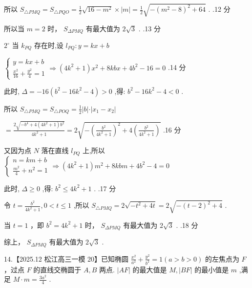 \documentclass[10pt]{article}
\begin{document}
所以 \({S}_{\bigtriangleup {PMQ}} = {S}_{\bigtriangleup {PQO}} = \frac{1}{2}\sqrt{{16} - {m}^{2}} \times  \left| m\right|  = \frac{1}{2}\sqrt{-{\left( {m}^{2} - 8\right) }^{2} + {64}}\) . .12 分

所以当 \(m = 2\) 时， \({S}_{\Delta PMQ}\) 有最大值为 \(2\sqrt{3}\) . .13 分

\({2}^{ \circ  }\) 当 \({k}_{PQ}\) 存在时,设 \({l}_{PQ} : y = {kx} + b\)

\(\left\{  {\begin{matrix} y = {kx} + b \\  \frac{{x}^{2}}{16} + \frac{{y}^{2}}{4} = 1 \end{matrix} \Rightarrow  \left( {4{k}^{2} + 1}\right) {x}^{2} + {8kbx} + 4{b}^{2} - {16} = 0}\right.\) .14 分

此时, \(\Delta  =  - {16}\left( {{b}^{2} - {16}{k}^{2} - 4}\right)  > 0\) ,得: \({b}^{2} - {16}{k}^{2} - 4 < 0\) .

所以 \({S}_{\bigtriangleup {PMQ}} = {S}_{\bigtriangleup {POQ}} = \frac{1}{2}\left| {b\left| \cdot \right| {x}_{1} - {x}_{2}}\right|\)

\(= \frac{2\sqrt{-{b}^{4} + 4\left( {4{k}^{2} + 1}\right) {b}^{2}}}{4{k}^{2} + 1} = 2\sqrt{-{\left( \frac{{b}^{2}}{4{k}^{2} + 1}\right) }^{2} + 4\left( \frac{{b}^{2}}{4{k}^{2} + 1}\right) }\) .16 分

又因为点 \(N\) 落在直线 \({l}_{PQ}\) 上,所以 \(\left\{  {\begin{array}{l} n = {km} + b \\  \frac{{m}^{2}}{4} + {n}^{2} = 1 \end{array} \Rightarrow  \left( {4{k}^{2} + 1}\right) {m}^{2} + {8kbm} + 4{b}^{2} - 4 = 0}\right.\)

此时, \(\Delta  \geq  0\) ,得: \({b}^{2} \leq  4{k}^{2} + 1\) . .17 分

令 \(t = \frac{{b}^{2}}{4{k}^{2} + 1},0 < t \leq  1\) ,所以 \({S}_{\bigtriangleup {PMQ}} = 2\sqrt{-{t}^{2} + {4t}} = 2\sqrt{-{\left( t - 2\right) }^{2} + 4}\) .

当 \(t = 1\) ，即 \({b}^{2} = 4{k}^{2} + 1\) 时， \({S}_{\Delta PMQ}\) 有最大值为 \(2\sqrt{3}\) . .18 分

综上， \({S}_{\Delta PMQ}\) 有最大值为 \(2\sqrt{3}\) .

14.【2025.12 松江高三一模 20】已知椭圆 \(\frac{{x}^{2}}{{a}^{2}} + \frac{{y}^{2}}{{b}^{2}} = 1\left( {a > b > 0}\right)\) 的左焦点为 \(F\) ，过点 \(F\) 的直线交椭圆于 \(A,B\) 两点. \(\left| {AF}\right|\) 的最大值是 \(M,\left| {BF}\right|\) 的最小值是 \(m\) ,满足 \(M \cdot  m = \frac{3{a}^{2}}{4}\) .
\end{document}
